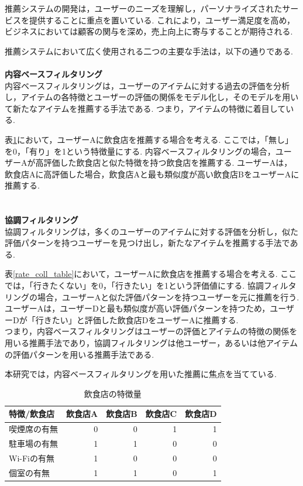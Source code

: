 \documentclass[12pt,a4j]{jreport}
\begin{document}
推薦システムの開発は，ユーザーのニーズを理解し，パーソナライズされたサービスを提供することに重点を置いている.
これにより，ユーザー満足度を高め，ビジネスにおいては顧客の関与を深め，売上向上に寄与することが期待される.

推薦システムにおいて広く使用される二つの主要な手法は，以下の通りである.\\\\
\textbf{内容ベースフィルタリング}\\
内容ベースフィルタリングは，ユーザーのアイテムに対する過去の評価を分析し，アイテムの各特徴とユーザーの評価の関係をモデル化し，そのモデルを用いて新たなアイテムを推薦する手法である.
つまり，アイテムの特徴に着目している.

表\ref{rate_content_table}において，ユーザーAに飲食店を推薦する場合を考える. 
ここでは，「無し」を0，「有り」を1という特徴量にする.
内容ベースフィルタリングの場合，ユーザーAが高評価した飲食店と似た特徴を持つ飲食店を推薦する.
ユーザーAは，飲食店Aに高評価した場合，飲食店Aと最も類似度が高い飲食店BをユーザーAに推薦する.\\\\\\
\textbf{協調フィルタリング}\\
協調フィルタリングは，多くのユーザーのアイテムに対する評価を分析し，似た評価パターンを持つユーザーを見つけ出し，新たなアイテムを推薦する手法である.

表\ref{rate_coll_table}において，ユーザーAに飲食店を推薦する場合を考える.
ここでは，「行きたくない」を0，「行きたい」を1という評価値にする.
協調フィルタリングの場合，ユーザーAと似た評価パターンを持つユーザーを元に推薦を行う.
ユーザーAは，ユーザーDと最も類似度が高い評価パターンを持つため，ユーザーDが「行きたい」と評価した飲食店DをユーザーAに推薦する.\\

つまり，内容ベースフィルタリングはユーザーの評価とアイテムの特徴の関係を用いる推薦手法であり，協調フィルタリングは他ユーザー，あるいは他アイテムの評価パターンを用いる推薦手法である.

本研究では，内容ベースフィルタリングを用いた推薦に焦点を当てている.\\

\begin{table}[htbp]
  \begin{center}
    \begin{tabular}{|l|r|r|r|r|}\hline
      \textbf{特徴/飲食店} & 飲食店A & 飲食店B & 飲食店C & 飲食店D \\ \hline
      喫煙席の有無       & 0        & 0        & 1        & 1 \\ \hline
      駐車場の有無       & 1        & 1        & 0        & 0 \\ \hline
      Wi-Fiの有無       & 1        & 0        & 0        & 0 \\ \hline
      個室の有無         & 1        & 1        & 0        & 1 \\ \hline
    \end{tabular}
  \end{center}
  \caption{飲食店の特徴量}
  \label{rate_content_table}
\end{table}
\end{document}
